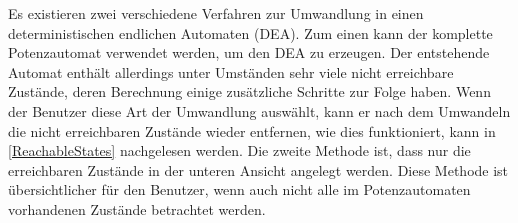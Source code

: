 Es existieren zwei verschiedene Verfahren zur Umwandlung in einen
deterministischen endlichen Automaten (DEA). Zum einen kann der komplette
Potenzautomat verwendet werden, um den DEA zu erzeugen. Der entstehende Automat
enthält allerdings unter Umständen sehr viele nicht erreichbare Zustände, deren
Berechnung einige zusätzliche Schritte zur Folge haben. Wenn der Benutzer diese
Art der Umwandlung auswählt, kann er nach dem Umwandeln die nicht erreichbaren
Zustände wieder entfernen, wie dies funktioniert, kann in \ref{ReachableStates}
nachgelesen werden. Die zweite Methode ist, dass nur die erreichbaren Zustände
in der unteren Ansicht angelegt werden. Diese Methode ist übersichtlicher für
den Benutzer, wenn auch nicht alle im Potenzautomaten vorhandenen Zustände
betrachtet werden.\vspace{10pt}
